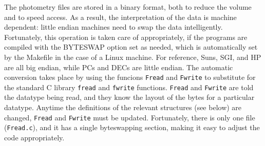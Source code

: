 \documentclass{article}
\begin{document}
The photometry files are stored in a binary format, both to reduce the
volume and to speed access.  As a result, the interpretation of the
data is machine dependent: little endian machines need to swap the
data intelligently.  Fortunately, this operation is taken care of
appropriately, if the programs are compiled with the BYTESWAP option
set as needed, which is automatically set by the Makefile in the case
of a Linux machine.  For reference, Suns, SGI, and HP are all big
endian, while PCs and DECs are little endian.  The automatic
conversion takes place by using the funcions {\tt Fread} and {\tt Fwrite}
to substitute for the standard C library {\tt fread} and {\tt fwrite}
functions.  {\tt Fread} and {\tt Fwrite} are told the datatype being read,
and they know the layout of the bytes for a particular datatype.
Anytime the definitions of the relevant structures (see below) are
changed, {\tt Fread} and {\tt Fwrite} must be updated.  Fortunately, there
is only one file ({\tt Fread.c}), and it has a single byteswapping
section, making it easy to adjust the code appropriately.
\end{document}
